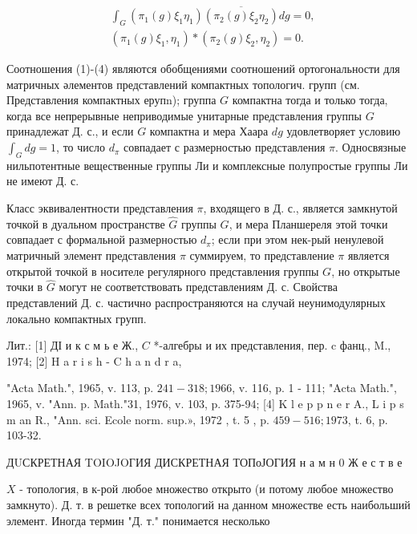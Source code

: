 \documentclass[10pt]{article}
\begin{document}
\[

\begin{aligned}

& \int_{G}\left(\pi_{1}(g) \xi_{1} \eta_{1}\right) \overline{\left(\pi_{2}(g) \xi_{2} \eta_{2}\right)} d g=0, \\

& \left(\pi_{1}(g) \xi_{1}, \eta_{1}\right) *\left(\pi_{2}(g) \xi_{2}, \eta_{2}\right)=0 .

\end{aligned}

\]



Соотношения (1)-(4) являются обобщениями соотношений ортогональности для матричных әлементов представлений компактных топологич. групп (см. Представления компактных ерупn); группа $G$ компактна тогда и только тогда, когда все непрерывные неприводимые унитарные представления группы $G$ принадлежат Д. с., и если $G$ компактна и мера Хаара $d g$ удовлетворяет условию $\int_{G} d g=1$, то число $d_{\pi}$ совпадает с размерностью представления $\pi$. Односвязные нильпотентные вещественные группы Ли и комплексные полупростые группы Ли не имеют Д. с.



Класс эквивалентности представления $\pi$, входящего в Д. с., является замкнутой точкой в дуальном пространстве $\hat{G}$ группы $G$, и мера Планшереля этой точки совпадает с формальной размерностью $d_{\pi}$; если при этом нек-рый ненулевой матричный элемент представления $\pi$ суммируем, то представление $\pi$ является открытой точкой в носителе регулярного представления группы $G$, но открытые точки в $\widehat{G}$ могут не соответствовать представлениям Д. с. Свойства представлений Д. с. частично распространяются на случай неунимодулярных локально компактных групп.



Лит.: [1] ДІ и к с м ь е Ж., $C$ *-алгебры и их представления, пер. c фанц., M., 1974; [2] H a r i s h - C h a n d r a,

"Acta Math.", 1965, v. 113, p. $241-318 ; 1966$, v. 116, p. 1 - 111; "Acta Math.", 1965, v. "Ann. p. Math."31, 1976, v. 103, p. 375-94; [4] K l e p p n e r A., L i p s m an R., "Ann. sci. Ecole norm. sup.», 1972 , t. 5 , p. $459-516 ; 1973$, t. 6, p. 103-32.



ДUСКРЕТНАЯ TOIOJOГИЯ ДИСКРЕТНАЯ ТОПоЈОГИЯ н а м н 0 Ж е с т в е

$X$ - топология, в к-рой любое множество открыто (и потому любое множество замкнуто). Д. т. в решетке всех топологий на данном множестве есть наибольший элемент. Иногда термин "Д. т." понимается несколько
\end{document}
